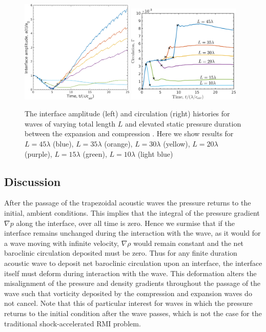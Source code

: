 \begin{figure}[h] 
  \centering
  \includegraphics[width=0.48\textwidth]{./figs/lung_figs/interface_multi-lag}
  \includegraphics[width=0.48\textwidth]{./figs/lung_figs/circulation_multi-lag_fixed}
  \caption[The interface and circulation dependence on wave
  duration]{The interface amplitude (left) and circulation (right)
    histories for waves of varying total length $L$ and elevated
    static pressure duration between the expansion and compression
    . Here we show results for $L=45\lambda$ (blue), $L=35\lambda$
    (orange), $L=30\lambda$ (yellow), $L=20\lambda$ (purple),
    $L=15\lambda$ (green), $L=10\lambda$ (light blue)}
  \label{fig:trapz_circ_interface_multi-lag}
\end{figure}
%
\subsection{Discussion}
\label{subsec:discussion}
After the passage of the trapezoidal acoustic waves the pressure
returns to the initial, ambient conditions. This implies that the
integral of the pressure gradient $\nabla p$ along the interface, over
all time is zero. Hence we surmise that if the interface remains
unchanged during the interaction with the wave, as it would for a wave
moving with infinite velocity, $\nabla \rho$ would remain constant and
the net baroclinic circulation deposited must be zero. Thus for any
finite duration acoustic wave to deposit net baroclinic circulation
upon an interface, the interface itself must deform during interaction
with the wave. This deformation alters the misalignment of the
pressure and density gradients throughout the passage of the wave such
that vorticity deposited by the compression and expansion waves do not
cancel. Note that this of particular interest for waves in which
the pressure returns to the initial condition after the wave passes,
which is not the case for the traditional shock-accelerated \ac{RMI}
problem.

